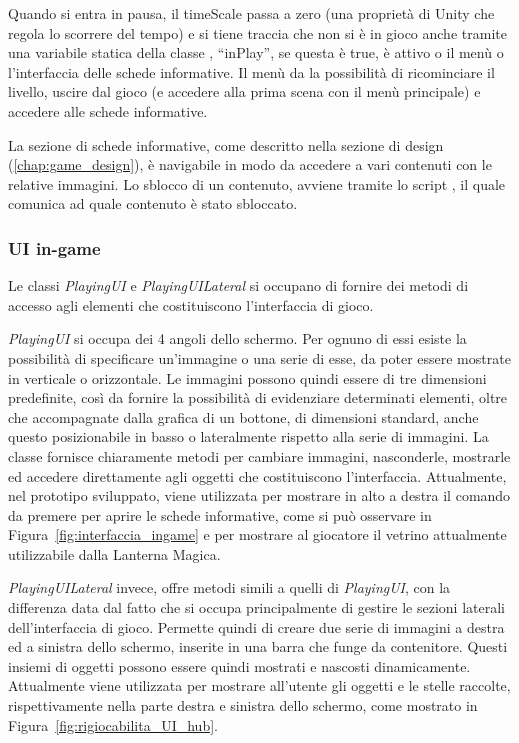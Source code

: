 Quando si entra in pausa, il timeScale passa a zero (una proprietà di Unity che regola lo scorrere del tempo) e si tiene traccia che non si è in gioco anche tramite una variabile statica della classe , ``inPlay'', se questa è true, è attivo o il menù o l'interfaccia delle schede informative.
Il menù da la possibilità di ricominciare il livello, uscire dal gioco (e accedere alla prima scena con il menù principale) e accedere alle schede informative. 

La sezione di schede informative, come descritto nella sezione di design (\ref{chap:game_design}), è navigabile in modo da accedere a vari contenuti con le relative immagini. Lo sblocco di un contenuto, avviene tramite lo script , il quale comunica ad  quale contenuto è stato sbloccato.

\subsubsection{UI in-game}

Le classi \textit{PlayingUI} e \textit{PlayingUILateral} si occupano di fornire dei metodi di accesso agli elementi che costituiscono l’interfaccia di gioco.

\textit{PlayingUI} si occupa dei 4 angoli dello schermo. Per ognuno di essi esiste la possibilità di specificare un’immagine o una serie di esse, da poter essere mostrate in verticale o orizzontale.
Le immagini possono quindi essere di tre dimensioni predefinite, così da fornire la possibilità di evidenziare determinati elementi, oltre che accompagnate dalla grafica di un bottone, di dimensioni standard, anche questo posizionabile in basso o lateralmente rispetto alla serie di immagini.
La classe fornisce chiaramente metodi per cambiare immagini, nasconderle, mostrarle ed accedere direttamente agli oggetti che costituiscono l’interfaccia.
Attualmente, nel prototipo sviluppato, viene utilizzata per mostrare in alto a destra il comando da premere per aprire le schede informative, come si può osservare in Figura~\ref{fig:interfaccia_ingame} e per mostrare al giocatore il vetrino attualmente utilizzabile dalla Lanterna Magica.

\textit{PlayingUILateral} invece, offre metodi simili a quelli di \textit{PlayingUI}, con la differenza data dal fatto che si occupa principalmente di gestire le sezioni laterali dell’interfaccia di gioco.
Permette quindi di creare due serie di immagini a destra ed a sinistra dello schermo, inserite in una barra che funge da contenitore. Questi insiemi di oggetti possono essere quindi mostrati e nascosti dinamicamente.
Attualmente viene utilizzata per mostrare all’utente gli oggetti e le stelle raccolte, rispettivamente nella parte destra e sinistra dello schermo, come mostrato in Figura~\ref{fig:rigiocabilita_UI_hub}.


